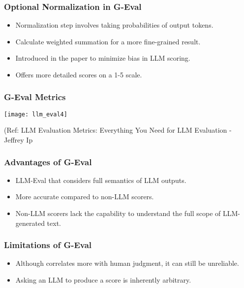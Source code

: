 \begin{frame}[fragile]\frametitle{Optional Normalization in G-Eval}
  \begin{itemize}
    \item Normalization step involves taking probabilities of output tokens.
    \item Calculate weighted summation for a more fine-grained result.
    \item Introduced in the paper to minimize bias in LLM scoring.
    \item Offers more detailed scores on a 1-5 scale.
  \end{itemize}
\end{frame}

\begin{frame}[fragile]\frametitle{G-Eval Metrics}


\begin{center}
\texttt{[image: llm\_eval4]}
\end{center}		
		
{\tiny (Ref: LLM Evaluation Metrics: Everything You Need for LLM Evaluation - Jeffrey Ip}
			
			
\end{frame}

\begin{frame}[fragile]\frametitle{Advantages of G-Eval}
  \begin{itemize}
    \item LLM-Eval that considers full semantics of LLM outputs.
    \item More accurate compared to non-LLM scorers.
    \item Non-LLM scorers lack the capability to understand the full scope of LLM-generated text.
  \end{itemize}
\end{frame}

\begin{frame}[fragile]\frametitle{Limitations of G-Eval}
  \begin{itemize}
    \item Although correlates more with human judgment, it can still be unreliable.
    \item Asking an LLM to produce a score is inherently arbitrary.
  \end{itemize}
\end{frame}


